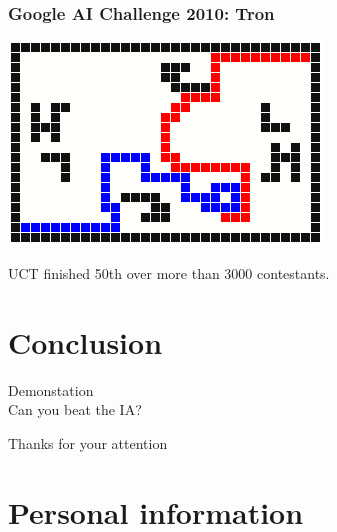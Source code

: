 \documentclass{beamer}
\begin{document}
\begin{frame}
\frametitle{Google AI Challenge 2010: Tron}
\begin{center}
\includegraphics[width=.7\linewidth]{tron} \\
\end{center}
UCT finished 50th over more than 3000 contestants.
\end{frame}

\section{Conclusion}

\begin{frame}
\begin{center}
\Huge Demonstation \\ Can you beat the IA?
\end{center}
\end{frame}

\begin{frame}
\begin{center}
\Huge Thanks for your attention
\end{center}
\end{frame}

\section{Personal information}
\end{document}
